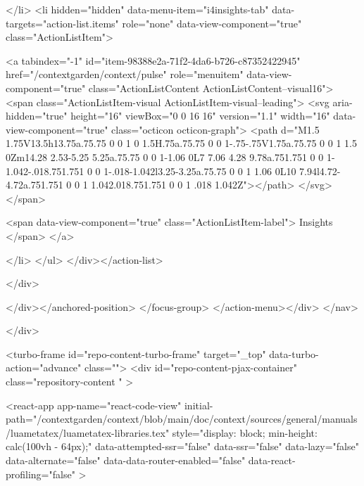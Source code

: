 </li>
        <li hidden="hidden" data-menu-item="i4insights-tab" data-targets="action-list.items" role="none" data-view-component="true" class="ActionListItem">
    
    
    <a tabindex="-1" id="item-98388e2a-71f2-4da6-b726-c87352422945" href="/contextgarden/context/pulse" role="menuitem" data-view-component="true" class="ActionListContent ActionListContent--visual16">
        <span class="ActionListItem-visual ActionListItem-visual--leading">
          <svg aria-hidden="true" height="16" viewBox="0 0 16 16" version="1.1" width="16" data-view-component="true" class="octicon octicon-graph">
    <path d="M1.5 1.75V13.5h13.75a.75.75 0 0 1 0 1.5H.75a.75.75 0 0 1-.75-.75V1.75a.75.75 0 0 1 1.5 0Zm14.28 2.53-5.25 5.25a.75.75 0 0 1-1.06 0L7 7.06 4.28 9.78a.751.751 0 0 1-1.042-.018.751.751 0 0 1-.018-1.042l3.25-3.25a.75.75 0 0 1 1.06 0L10 7.94l4.72-4.72a.751.751 0 0 1 1.042.018.751.751 0 0 1 .018 1.042Z"></path>
</svg>
        </span>
      
        <span data-view-component="true" class="ActionListItem-label">
          Insights
</span>      
</a>
  
</li>
</ul>    
</div></action-list>


</div>
      
</div></anchored-position>  </focus-group>
</action-menu></div>
</nav>

  </div>

  



<turbo-frame id="repo-content-turbo-frame" target="_top" data-turbo-action="advance" class="">
    <div id="repo-content-pjax-container" class="repository-content " >
    



    
      
    








<react-app
  app-name="react-code-view"
  initial-path="/contextgarden/context/blob/main/doc/context/sources/general/manuals/luametatex/luametatex-libraries.tex"
    style="display: block; min-height: calc(100vh - 64px);"
  data-attempted-ssr="false"
  data-ssr="false"
  data-lazy="false"
  data-alternate="false"
  data-data-router-enabled="false"
  data-react-profiling="false"
>
  
